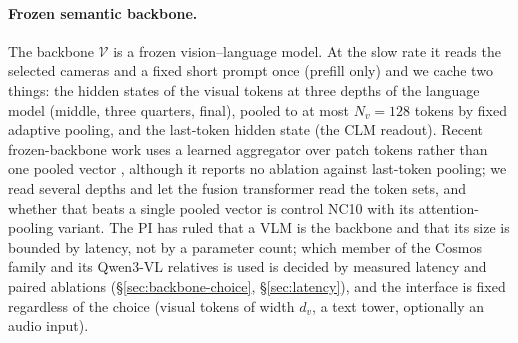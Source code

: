 \paragraph{Frozen semantic backbone.}
The backbone $\mathcal V$ is a frozen vision--language model. At the slow rate it reads the selected cameras and a fixed short prompt once (prefill only) and we cache two
things: the hidden states of the visual tokens at three depths of the language model (middle, three quarters, final), pooled to at most $N_v=128$ tokens by fixed adaptive pooling, and the last-token hidden state
(the CLM readout). Recent frozen-backbone work uses a learned aggregator over patch tokens rather than one pooled vector \citep{kwok2026cover}, although it reports no ablation against last-token pooling; we read several depths and let the fusion transformer read the token sets, and whether that beats a single pooled vector is control NC10 with its attention-pooling variant.
The PI has ruled that a VLM is the backbone and that its size is bounded by latency, not by a parameter count; which member of the Cosmos family and its Qwen3-VL relatives is used is decided by measured latency and paired ablations (\S\ref{sec:backbone-choice}, \S\ref{sec:latency}), and the interface is fixed regardless of the choice
(visual tokens of width $d_v$, a text tower, optionally an audio input).

